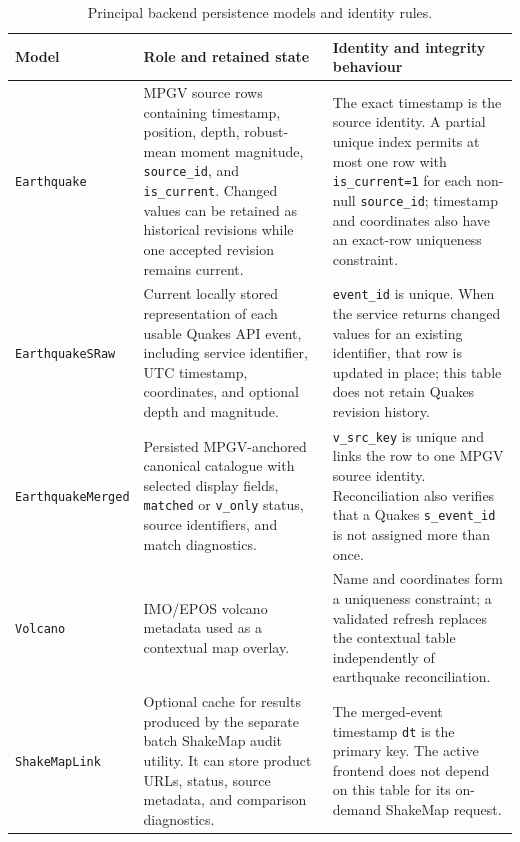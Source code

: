 \documentclass[12pt]{article}
\begin{document}
\begin{table}[H]
\centering
\caption{Principal backend persistence models and identity rules.}
\label{tab:backend-models}
\small
\setlength{\tabcolsep}{3pt}
\renewcommand{\arraystretch}{1.12}
\begin{tabular}{>{\raggedright\arraybackslash}p{3.25cm}>{\raggedright\arraybackslash}p{6.35cm}>{\raggedright\arraybackslash}p{5.2cm}}
\toprule
\textbf{Model} & \textbf{Role and retained state} & \textbf{Identity and integrity behaviour} \\
\midrule
\texttt{Earthquake} & MPGV source rows containing timestamp, position, depth, robust-mean moment magnitude, \texttt{source\_id}, and \texttt{is\_current}. Changed values can be retained as historical revisions while one accepted revision remains current. & The exact timestamp is the source identity. A partial unique index permits at most one row with \texttt{is\_current=1} for each non-null \texttt{source\_id}; timestamp and coordinates also have an exact-row uniqueness constraint. \\
\texttt{EarthquakeSRaw} & Current locally stored representation of each usable Quakes API event, including service identifier, UTC timestamp, coordinates, and optional depth and magnitude. & \texttt{event\_id} is unique. When the service returns changed values for an existing identifier, that row is updated in place; this table does not retain Quakes revision history. \\
\texttt{EarthquakeMerged} & Persisted MPGV-anchored canonical catalogue with selected display fields, \texttt{matched} or \texttt{v\_only} status, source identifiers, and match diagnostics. & \texttt{v\_src\_key} is unique and links the row to one MPGV source identity. Reconciliation also verifies that a Quakes \texttt{s\_event\_id} is not assigned more than once. \\
\texttt{Volcano} & IMO/EPOS volcano metadata used as a contextual map overlay. & Name and coordinates form a uniqueness constraint; a validated refresh replaces the contextual table independently of earthquake reconciliation. \\
\texttt{ShakeMapLink} & Optional cache for results produced by the separate batch ShakeMap audit utility. It can store product URLs, status, source metadata, and comparison diagnostics. & The merged-event timestamp \texttt{dt} is the primary key. The active frontend does not depend on this table for its on-demand ShakeMap request. \\
\bottomrule
\end{tabular}
\end{table}
\end{document}
